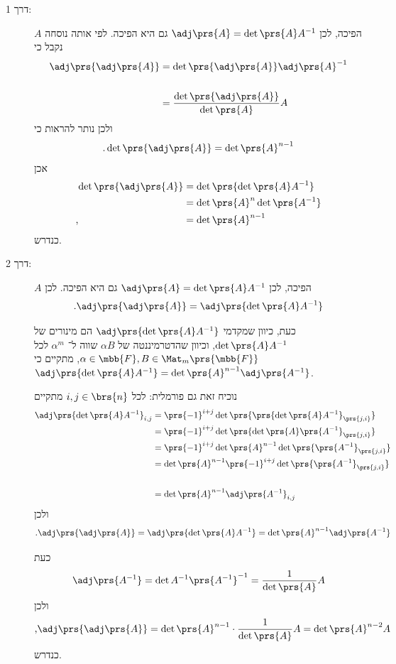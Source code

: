 \documentclass[a4paper,10pt,twoside,openany]{book}
\begin{document}
\begin{solution}
\begin{description}
\item[דרך 1:]
$A$
הפיכה, לכן
$\adj\prs{A} = \det\prs{A} A^{-1}$
גם היא הפיכה. לפי אותה נוסחה נקבל כי
\begin{align*}
\adj\prs{\adj\prs{A}} &= \det\prs{\adj\prs{A}} \adj\prs{A}^{-1} \\
\\&= \frac{\det\prs{\adj\prs{A}}}{\det\prs{A}} A
\end{align*}
ולכן נותר להראות כי
\begin{align*}
\text{.} \det\prs{\adj\prs{A}} = \det\prs{A}^{n-1}
\end{align*}
אכן
\begin{align*}
\det\prs{\adj\prs{A}} &= \det\prs{\det\prs{A} A^{-1}}
\\&= \det\prs{A}^n \det\prs{A^{-1}}
\\\text{,}\hphantom{\det\prs{\adj\prs{A}}}&= \det\prs{A}^{n-1}
\end{align*}
כנדרש.

\item[דרך 2:]
$A$
הפיכה, לכן
$\adj\prs{A} = \det\prs{A} A^{-1}$
גם היא הפיכה.
לכן
\[\text{.} \adj\prs{\adj\prs{A}} = \adj\prs{\det\prs{A} A^{-1}} \]

כעת, כיוון שמקדמי
$\adj\prs{\det\prs{A} A^{-1}}$
הם מינורים של
$\det\prs{A} A^{-1}$,
וכיוון שהדטרמיננטה של
$\alpha B$
שווה ל־%
$\alpha^m$
לכל
$\alpha \in \mbb{F}, B \in \Mat_m\prs{\mbb{F}}$,
מתקיים כי
$\adj\prs{\det\prs{A} A^{-1}} = \det\prs{A}^{n-1} \adj\prs{A^{-1}}$.

נוכיח זאת גם פורמלית:
לכל
$i,j \in\brs{n}$
מתקיים
\begin{align*}
\adj\prs{\det\prs{A} A^{-1}}_{i,j} &= \prs{-1}^{i+j} \det\prs{\prs{\det\prs{A} A^{-1}}_{\prs{j,i}}}
\\&= \prs{-1}^{i+j} \det\prs{\det\prs{A} \prs{A^{-1}}_{\prs{j,i}}}
\\&= \prs{-1}^{i+j} \det\prs{A}^{n-1} \det\prs{\prs{A^{-1}}_{\prs{j,i}}}
\\&= \det\prs{A}^{n-1} \prs{-1}^{i+j} \det\prs{\prs{A^{-1}}_{\prs{j,i}}} \\
\\&= \det\prs{A}^{n-1} \adj\prs{A^{-1}}_{i,j}
\end{align*}
ולכן
\[\text{.} \adj\prs{\adj\prs{A}} = \adj\prs{\det\prs{A} A^{-1}} = \det\prs{A}^{n-1} \adj\prs{A^{-1}}\]

כעת
\[\adj\prs{A^{-1}} = \det{A^{-1}} \prs{A^{-1}}^{-1} = \frac{1}{\det\prs{A}} A\]
ולכן
\[\text{,} \adj\prs{\adj\prs{A}} = \det\prs{A}^{n-1} \cdot \frac{1}{\det\prs{A}} A = \det\prs{A}^{n-2} A\]
כנדרש.
\end{description}

\end{solution}
\end{document}

